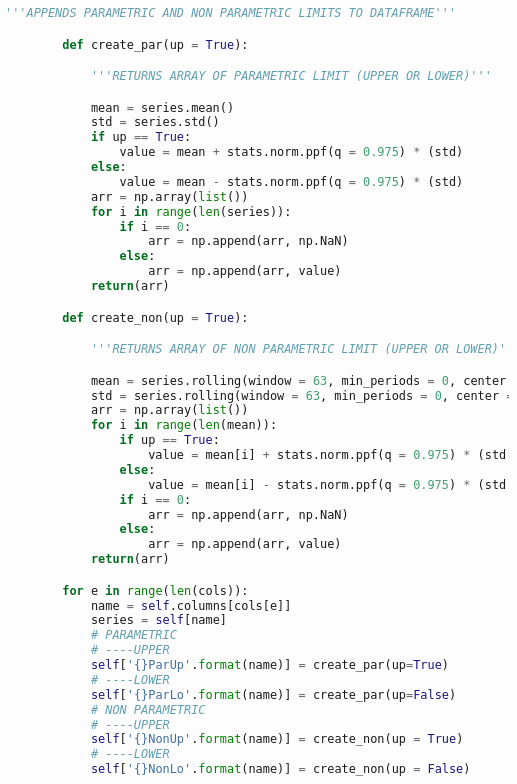 \begin{lstlisting}[language=Python]
        '''APPENDS PARAMETRIC AND NON PARAMETRIC LIMITS TO DATAFRAME'''

        def create_par(up = True):

            '''RETURNS ARRAY OF PARAMETRIC LIMIT (UPPER OR LOWER)'''

            mean = series.mean()
            std = series.std()
            if up == True:
                value = mean + stats.norm.ppf(q = 0.975) * (std)
            else:
                value = mean - stats.norm.ppf(q = 0.975) * (std)
            arr = np.array(list())
            for i in range(len(series)):
                if i == 0:
                    arr = np.append(arr, np.NaN)
                else:
                    arr = np.append(arr, value)
            return(arr)

        def create_non(up = True):

            '''RETURNS ARRAY OF NON PARAMETRIC LIMIT (UPPER OR LOWER)'''

            mean = series.rolling(window = 63, min_periods = 0, center = True).mean()
            std = series.rolling(window = 63, min_periods = 0, center = True).std()
            arr = np.array(list())
            for i in range(len(mean)):
                if up == True:
                    value = mean[i] + stats.norm.ppf(q = 0.975) * (std[i])
                else:
                    value = mean[i] - stats.norm.ppf(q = 0.975) * (std[i])
                if i == 0:
                    arr = np.append(arr, np.NaN)
                else:
                    arr = np.append(arr, value)
            return(arr)

        for e in range(len(cols)):
            name = self.columns[cols[e]]
            series = self[name]
            # PARAMETRIC
            # ----UPPER
            self['{}ParUp'.format(name)] = create_par(up=True)
            # ----LOWER 
            self['{}ParLo'.format(name)] = create_par(up=False)
            # NON PARAMETRIC
            # ----UPPER
            self['{}NonUp'.format(name)] = create_non(up = True)
            # ----LOWER
            self['{}NonLo'.format(name)] = create_non(up = False)
        
\end{lstlisting}